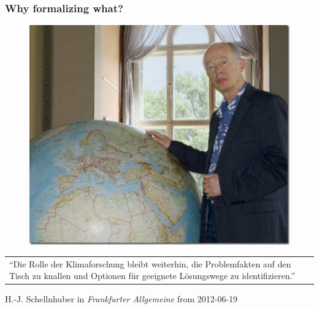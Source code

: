 \documentclass[colorhighlight,coloremph]{beamer}
\begin{document}

\begin{frame}[fragile]
\frametitle{Why formalizing what?}
%
\begin{figure}[h]                                                                                                         
  \includegraphics[scale=0.4]{schellnhuber.pdf}                                                                           
\end{figure}                                                                                                              
\begin{tabular}{p{}}                                                                                         
``Die Rolle der Klimaforschung bleibt weiterhin, die Problemfakten auf                                                    
den Tisch zu knallen und Optionen f\"ur geeignete L\"osungswege zu                                                        
identifizieren.'' \\                                                                                                      
\end{tabular}                                                                                                             
                                                                                                                          
\hfill H.-J. Schellnhuber in \emph{Frankfurter Allgemeine} from 2012-06-19 \\  
%
\end{frame}
\end{document}
